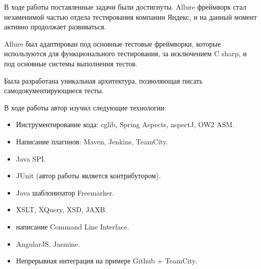 \startconclusionpage

В ходе работы поставленные задачи были достигнуты. Allure фреймворк стал незаменимой частью отдела тестирования компании Яндекс, и на данный момент активно продолжает развиваться.

Allure был адаптирован под основные тестовые фреймворки, которые используются для функционального тестирования, за исключением C sharp, и под основные системы выполнения тестов.

Была разработана уникальная архитектура, позволяющая писать самодокументирующиеся тесты.

В ходе работы автор изучил следующие технологии:

\begin{itemize}
\item Инструментирование кода: cglib, Spring Aspects, aspectJ, OW2 ASM.
\item Написание плагинов: Maven, Jenkins, TeamCity.
\item Java SPI.
\item JUnit (автор работы является контрибутором).
\item Java шаблонизатор Freemarker.
\item XSLT, XQuery, XSD, JAXB.
\item написание Command Line Interface.
\item AngularJS, Jasmine.
\item Непрерывная интеграция на примере Github + TeamCity.
\end{itemize}

 

